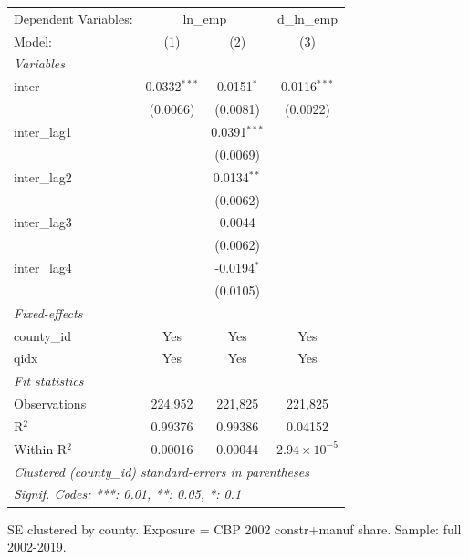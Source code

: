 
\begingroup
\centering
\begin{tabular}{lccc}
   \tabularnewline \midrule \midrule
   Dependent Variables: & \multicolumn{2}{c}{ln\_emp} & d\_ln\_emp\\
   Model:       & (1)            & (2)            & (3)\\  
   \midrule
   \emph{Variables}\\
   inter        & 0.0332$^{***}$ & 0.0151$^{*}$   & 0.0116$^{***}$\\   
                & (0.0066)       & (0.0081)       & (0.0022)\\   
   inter\_lag1  &                & 0.0391$^{***}$ &   \\   
                &                & (0.0069)       &   \\   
   inter\_lag2  &                & 0.0134$^{**}$  &   \\   
                &                & (0.0062)       &   \\   
   inter\_lag3  &                & 0.0044         &   \\   
                &                & (0.0062)       &   \\   
   inter\_lag4  &                & -0.0194$^{*}$  &   \\   
                &                & (0.0105)       &   \\   
   \midrule
   \emph{Fixed-effects}\\
   county\_id   & Yes            & Yes            & Yes\\  
   qidx         & Yes            & Yes            & Yes\\  
   \midrule
   \emph{Fit statistics}\\
   Observations & 224,952        & 221,825        & 221,825\\  
   R$^2$        & 0.99376        & 0.99386        & 0.04152\\  
   Within R$^2$ & 0.00016        & 0.00044        & $2.94\times 10^{-5}$\\   
   \midrule \midrule
   \multicolumn{4}{l}{\emph{Clustered (county\_id) standard-errors in parentheses}}\\
   \multicolumn{4}{l}{\emph{Signif. Codes: ***: 0.01, **: 0.05, *: 0.1}}\\
\end{tabular}
 
\par \raggedright 
SE clustered by county. Exposure = CBP 2002 constr+manuf share. Sample: full 2002-2019.
\par\endgroup


